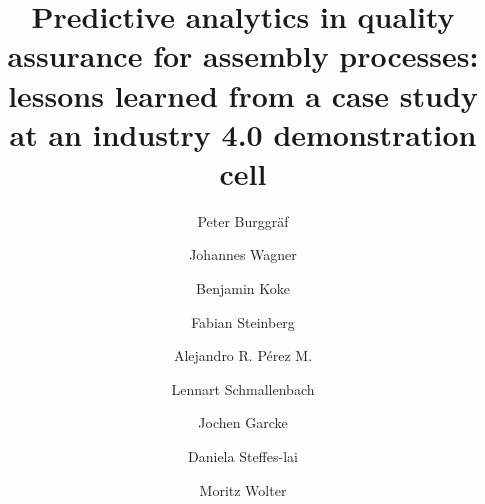 \documentclass[5p,times,procedia]{elsarticle}
\begin{document}
\begin{frontmatter}



%

\title{Predictive analytics in quality assurance for assembly processes:
       lessons learned from a case study at an industry 4.0 demonstration cell}




\author[a]{Peter Burggräf}
\author[a]{Johannes Wagner}
\author[a]{Benjamin Koke}
\author[a]{Fabian Steinberg} 
\author[a]{Alejandro R. Pérez M.}
\author[a]{Lennart Schmallenbach}
\author[b,c]{Jochen Garcke}
\author[b]{Daniela Steffes-lai}
\author[b,d]{Moritz Wolter}


\address[a]{Chair of International Production Engineering and Management (IPEM), Universität Siegen, Paul-Bonatz-Straße 9-11, Siegen - 57076, Germany}
\address[b]{Fraunhofer Institute for Algorithms and Scientific Computing (SCAI), Schloss Birlinghoven 1, Sankt Augustin- 53757, Germany}
\address[c]{Institut for Numerical Simulation, Universität Bonn, Endenicher Allee 19b, 53115 Bonn}
\address[d]{Institut for Computer Science, Universität Bonn, Endenicher Allee 19a, 53115 Bonn}



\end{frontmatter}
\end{document}
